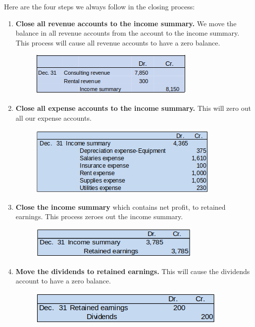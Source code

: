 \documentclass[../main.tex]{subfiles}
\begin{document}
	Here are the four steps we always follow in the closing process:
	\begin{enumerate}[noitemsep]
		\item \textbf{Close all revenue accounts to the income summary.} We 
		move the 
		balance in all revenue accounts from the account to the income summary. 
		This process will cause all revenue accounts to have a zero balance.
		\begin{figure}[ht]
			\centering
			\includegraphics[width=0.6\columnwidth]{images/c4/closing_revenue.png}
		\end{figure}
		\item \textbf{Close all expense accounts to the income summary.} This 
		will zero out all our expense accounts.
		\begin{figure}[ht]
			\centering
			\includegraphics[width=0.60\columnwidth]{images/c4/close_expenses.png}
		\end{figure}
		\item \textbf{Close the income summary} which contains net profit, 
		to 
		retained 
		earnings. This process zeroes out the income summary.
		\begin{figure}[ht]
			\centering
			\includegraphics[width=0.60\columnwidth]{images/c4/close_income_summary.png}
		\end{figure}
		\item \textbf{Move the dividends to retained earnings.} This will cause 
		the dividends account to have a zero balance.
		\begin{figure}[ht]
			\centering
			\includegraphics[width=0.60\columnwidth]{images/c4/close_dividends.png}
		\end{figure}
	\end{enumerate}
	
\end{document}
